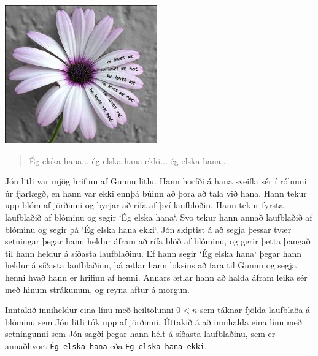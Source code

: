 
\includegraphics[scale=0.4]{flower.jpg}

\begin{quote}
Ég elska hana... ég elska hana ekki... ég elska hana...
\end{quote}

Jón litli var mjög hrifinn af Gunnu litlu. Hann horfði á hana sveifla sér í
rólunni úr fjarlægð, en hann var ekki ennþá búinn að þora að tala við hana.
Hann tekur upp blóm af jörðinni og byrjar að rífa af því laufblöðin. Hann tekur
fyrsta laufblaðið af blóminu og segir `Ég elska hana`. Svo tekur hann annað
laufblaðið af blóminu og segir þá `Ég elska hana ekki`. Jón skiptist á að
segja þessar tvær setningar þegar hann heldur áfram að rífa blöð af blóminu, og
gerir þetta þangað til hann heldur á síðasta laufblaðinu. Ef hann segir `Ég
elska hana` þegar hann heldur á síðasta laufblaðinu, þá ætlar hann loksins að
fara til Gunnu og segja henni hvað hann er hrifinn af henni. Annars ætlar hann
að halda áfram leika sér með hinum strákunum, og reyna aftur á morgun.

Inntakið inniheldur eina línu með heiltölunni $0 < n$ sem táknar fjölda
laufblaða á blóminu sem Jón litli tók upp af jörðinni. Úttakið á að innihalda
eina línu með setningunni sem Jón sagði þegar hann hélt á síðasta laufblaðinu,
sem er annaðhvort \texttt{Ég elska hana} eða \texttt{Ég elska hana ekki}.
